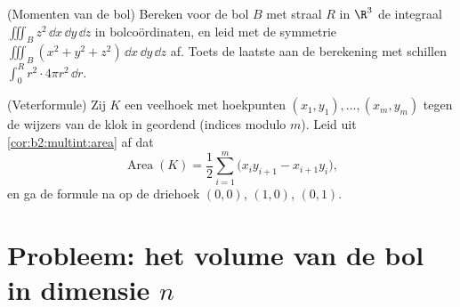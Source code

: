 \begin{exercise}[$\star\star$]\label{exo:b2:multint:11}
(Momenten van de bol) Bereken voor de bol $B$ met straal $R$ in
$\R^3$ de integraal $\iiint_B z^2\,\dd x\,\dd y\,\dd z$ in
bolcoördinaten, en leid met de symmetrie $\iiint_B (x^2 + y^2 +
z^2)\,\dd x\,\dd y\,\dd z$ af. Toets de laatste aan de berekening
met schillen $\int_0^R r^2\cdot4\pi r^2\,\dd r$.
\end{exercise}

\begin{exercise}[$\star\star$]\label{exo:b2:multint:12}
(Veterformule) Zij $K$ een veelhoek met hoekpunten $(x_1, y_1),
\dots, (x_m, y_m)$ tegen de wijzers van de klok in geordend
(indices modulo $m$). Leid uit \cref{cor:b2:multint:area} af dat
\[
\operatorname{Area}(K)
= \frac12\sum_{i=1}^m
\bigl(x_iy_{i+1} - x_{i+1}y_i\bigr) ,
\]
en ga de formule na op de driehoek $(0,0)$, $(1,0)$, $(0,1)$.
\end{exercise}

\section{Probleem: het volume van de bol in dimensie $n$}

